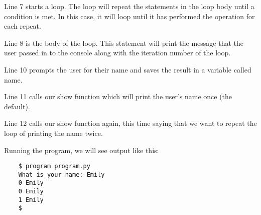 Line 7 starts a loop. The loop will repeat the statements in the loop body until
a condition is met. In this case, it will loop until it has performed the operation
for each repeat.

Line 8 is the body of the loop. This statement will print the message that the user
passed in to the console along with the iteration number of the loop.

Line 10 prompts the user for their name and saves the result in a variable called
name.

Line 11 calls our show function which will print the user's name once (the default).

Line 12 calls our show function again, this time saying that we want to repeat the
loop of printing the name twice.\newline

Running the program, we will see output like this:
\begin{verbatim}
    $ program program.py
    What is your name: Emily
    0 Emily
    0 Emily
    1 Emily
    $
\end{verbatim}